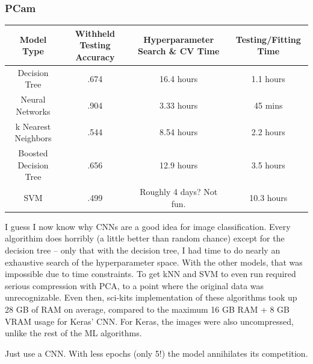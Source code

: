 \documentclass[a4paper]{article}
\begin{document}
\subsubsection{PCam}
\begin{center}
\begin{tabular}{ |c|c|c|c| } 
\hline
Model Type & Withheld Testing Accuracy & Hyperparameter Search \& CV Time & Testing/Fitting Time \\
\hline
Decision Tree & .674 & 16.4 hours & 1.1 hours\\ 
Neural Networks & .904 & 3.33 hours & 45 mins\\ 
k Nearest Neighbors & .544 & 8.54 hours & 2.2 hours\\ 
Boosted Decision Tree & .656 & 12.9 hours & 3.5 hours\\ 
SVM & .499 & Roughly 4 days? Not fun. & 10.3 hours\\ 
\hline
\end{tabular}
\end{center}
I guess I now know why CNNs are a good idea for image classification.
Every algorithim does horribly (a little better than random chance) except for the decision tree -- only that with the decision tree, I had time to do nearly an exhaustive search of the hyperparameter space. With the other models, that was impossible due to time constraints. To get kNN and SVM to even run required serious compression with PCA, to a point where the original data was unrecognizable. Even then, sci-kits implementation of these algorithms took up 28 GB of RAM on average, compared to the maximum 16 GB RAM + 8 GB VRAM usage for Keras' CNN. For Keras, the images were also uncompressed, unlike the rest of the ML algorithms.

Just use a CNN. With less epochs (only 5!) the model annihilates its competition.
\end{document}
